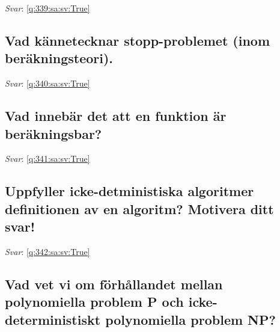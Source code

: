 \documentclass[a4paper,11pt,oneside]{article}
\begin{document}
\begin{sloppypar}
\noindent\makebox[\textwidth]{\hrulefill}

\vspace{1cm}

\textit{Svar}: \autoref{q:339:sa:sv:True}



\subsection{Vad k\"annetecknar stopp-problemet (inom ber\"akningsteori).}

\label{q:340:sa:sv:False}

\vspace{2cm}

\noindent\makebox[\textwidth]{\hrulefill}

\vspace{1cm}

\textit{Svar}: \autoref{q:340:sa:sv:True}



\subsection{Vad inneb\"ar det att en funktion \"ar ber\"akningsbar?}

\label{q:341:sa:sv:False}

\vspace{2cm}

\noindent\makebox[\textwidth]{\hrulefill}

\vspace{1cm}

\textit{Svar}: \autoref{q:341:sa:sv:True}



\subsection{Uppfyller icke-detministiska algoritmer definitionen av en algoritm? Motivera ditt svar!}

\label{q:342:sa:sv:False}

\vspace{2cm}

\noindent\makebox[\textwidth]{\hrulefill}

\vspace{1cm}

\textit{Svar}: \autoref{q:342:sa:sv:True}



\subsection{Vad vet vi om f\"orh\r{a}llandet mellan polynomiella problem P och icke-deterministiskt polynomiella problem NP?}


\end{sloppypar}
\end{document}

